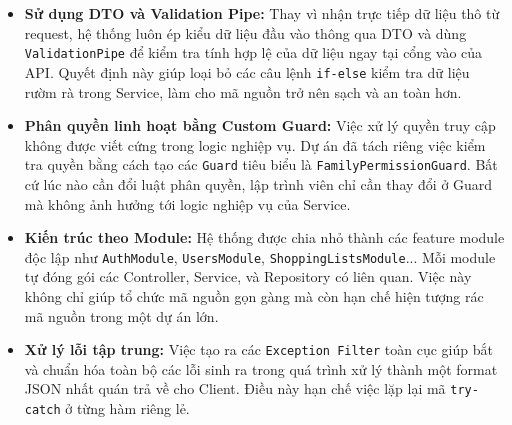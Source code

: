\documentclass[../main.tex]{subfiles}
\begin{document}
\begin{itemize}
    \item \textbf{Sử dụng DTO và Validation Pipe:} Thay vì nhận trực tiếp dữ liệu thô từ request, hệ thống luôn ép kiểu dữ liệu đầu vào thông qua DTO và dùng \texttt{ValidationPipe} để kiểm tra tính hợp lệ của dữ liệu ngay tại cổng vào của API. Quyết định này giúp loại bỏ các câu lệnh \texttt{if-else} kiểm tra dữ liệu rườm rà trong Service, làm cho mã nguồn trở nên sạch và an toàn hơn.
    \item \textbf{Phân quyền linh hoạt bằng Custom Guard:} Việc xử lý quyền truy cập không được viết cứng trong logic nghiệp vụ. Dự án đã tách riêng việc kiểm tra quyền bằng cách tạo các \texttt{Guard} tiêu biểu là \texttt{FamilyPermissionGuard}. Bất cứ lúc nào cần đổi luật phân quyền, lập trình viên chỉ cần thay đổi ở Guard mà không ảnh hưởng tới logic nghiệp vụ của Service.
    \item \textbf{Kiến trúc theo Module:} Hệ thống được chia nhỏ thành các feature module độc lập như \texttt{AuthModule}, \texttt{UsersModule}, \texttt{ShoppingListsModule}... Mỗi module tự đóng gói các Controller, Service, và Repository có liên quan. Việc này không chỉ giúp tổ chức mã nguồn gọn gàng mà còn hạn chế hiện tượng rác mã nguồn trong một dự án lớn.
    \item \textbf{Xử lý lỗi tập trung:} Việc tạo ra các \texttt{Exception Filter} toàn cục giúp bắt và chuẩn hóa toàn bộ các lỗi sinh ra trong quá trình xử lý thành một format JSON nhất quán trả về cho Client. Điều này hạn chế việc lặp lại mã \texttt{try-catch} ở từng hàm riêng lẻ.
\end{itemize}
\end{document}
